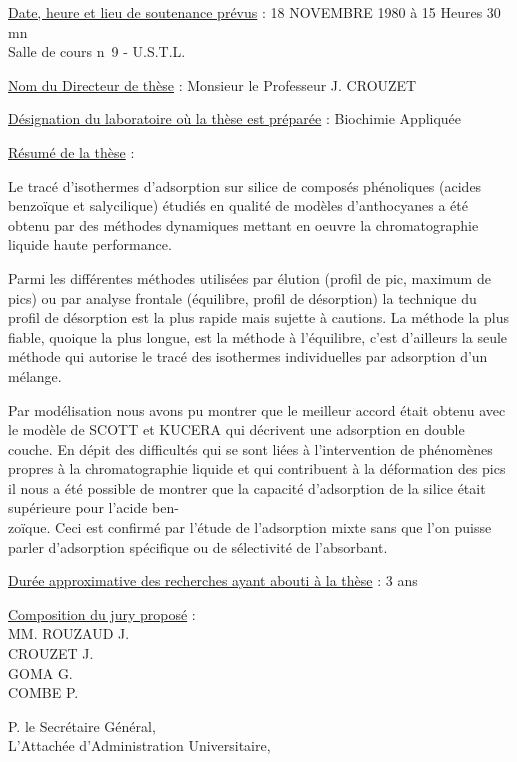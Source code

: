 \uline{Date, heure et lieu de soutenance prévus} : 18 NOVEMBRE 1980 à 15 Heures 30 mn\\
Salle de cours n\textdegree\ 9 - U.S.T.L.

\uline{Nom du Directeur de thèse} : Monsieur le Professeur J. CROUZET

\uline{Désignation du laboratoire où la thèse est préparée} : Biochimie Appliquée

\uline{Résumé de la thèse} :

Le tracé d'isothermes d'adsorption sur silice de composés phénoliques (acides benzoïque et salycilique) étudiés en qualité de modèles d'anthocyanes a été obtenu par des méthodes dynamiques mettant en oeuvre la chromatographie liquide haute performance.

Parmi les différentes méthodes utilisées par élution (profil de pic, maximum de pics) ou par analyse frontale (équilibre, profil de désorption) la technique du profil de désorption est la plus rapide mais sujette à cautions. La méthode la plus fiable, quoique la plus longue, est la méthode à l'équilibre, c'est d'ailleurs la seule méthode qui autorise le tracé des isothermes individuelles par adsorption d'un mélange.

Par modélisation nous avons pu montrer que le meilleur accord était obtenu avec le modèle de SCOTT et KUCERA qui décrivent une adsorption en double couche.
En dépit des difficultés qui se sont liées à l'intervention de phénomènes propres à la chromatographie liquide et qui contribuent à la déformation des pics il nous a été possible de montrer que la capacité d'adsorption de la silice était supérieure pour l'acide ben-\\
zoïque. Ceci est confirmé par l'étude de l'adsorption mixte sans que l'on puisse parler d'adsorption spécifique ou de sélectivité de l'absorbant.

\uline{Durée approximative des recherches ayant abouti à la thèse} : 3 ans

\uline{Composition du jury proposé} :\\
MM. ROUZAUD J.\\
\hspace*{2em}CROUZET J.\\
\hspace*{2em}GOMA G.\\
\hspace*{2em}COMBE P.

P. le Secrétaire Général,\\
L'Attachée d'Administration Universitaire,

